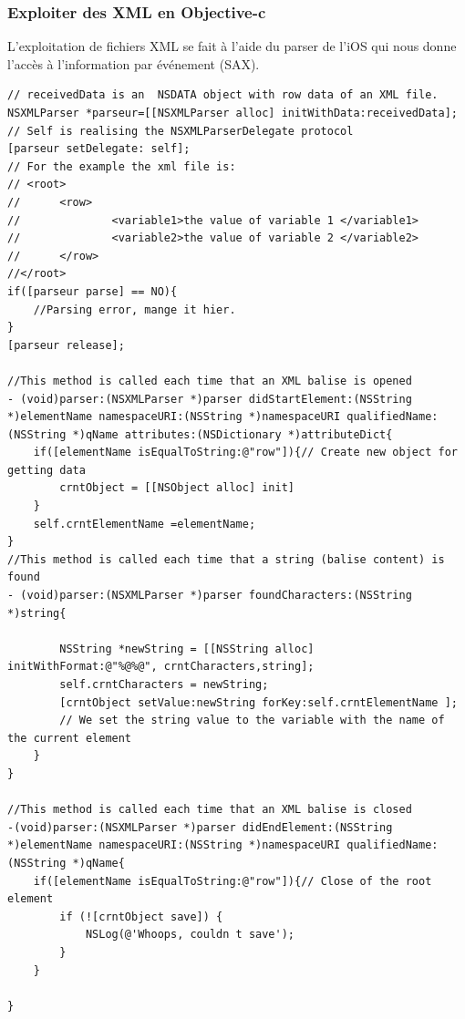 			\subsubsection{Exploiter des  XML en Objective-c}
			L'exploitation de fichiers XML se fait à l'aide du parser de l'iOS qui nous donne l'accès à l'information par événement (SAX).
			\lstset{
			    style = Xcode,
			    caption=Parsing d'un fichier XML en Objective-c .,
			    breaklines=true,
			    frame=single
			}
			
			\begin{lstlisting}[name= Parsing XML, label=NSXMLParser]
// receivedData is an  NSDATA object with row data of an XML file.
NSXMLParser *parseur=[[NSXMLParser alloc] initWithData:receivedData];
// Self is realising the NSXMLParserDelegate protocol
[parseur setDelegate: self];
// For the example the xml file is:
// <root>
//		<row>
//				<variable1>the value of variable 1 </variable1>
//				<variable2>the value of variable 2 </variable2>
//		</row>
//</root>
if([parseur parse] == NO){
	//Parsing error, mange it hier. 
}
[parseur release];	

//This method is called each time that an XML balise is opened
- (void)parser:(NSXMLParser *)parser didStartElement:(NSString *)elementName namespaceURI:(NSString *)namespaceURI qualifiedName:(NSString *)qName attributes:(NSDictionary *)attributeDict{
    if([elementName isEqualToString:@"row"]){// Create new object for getting data
		crntObject = [[NSObject alloc] init]
    }
    self.crntElementName =elementName;
}
//This method is called each time that a string (balise content) is found
- (void)parser:(NSXMLParser *)parser foundCharacters:(NSString *)string{
  
        NSString *newString = [[NSString alloc] initWithFormat:@"%@%@", crntCharacters,string];
        self.crntCharacters = newString;
        [crntObject setValue:newString forKey:self.crntElementName ];
        // We set the string value to the variable with the name of the current element
    }
}

//This method is called each time that an XML balise is closed
-(void)parser:(NSXMLParser *)parser didEndElement:(NSString *)elementName namespaceURI:(NSString *)namespaceURI qualifiedName:(NSString *)qName{
    if([elementName isEqualToString:@"row"]){// Close of the root element
        if (![crntObject save]) {
            NSLog(@'Whoops, couldn t save');
        }
    }
    
}
\end{lstlisting}

